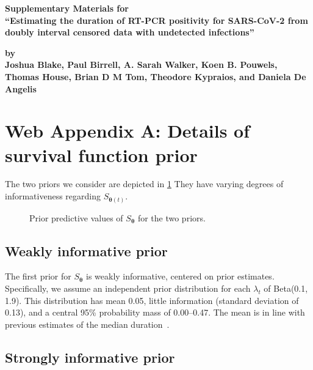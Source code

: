 \documentclass{article}
\renewcommand{\vec}[1]{\bm{#1}}
\begin{document}
%

\def\spacingset#1{\renewcommand{\baselinestretch}%
{#1}\small\normalsize} \spacingset{1}

\begin{center}
{\Large\bfseries Supplementary Materials for\\[6pt]
``Estimating the duration of RT-PCR positivity for SARS-CoV-2 from doubly interval censored data with undetected infections''}

\vskip 18pt

{\large\bfseries by\\[6pt]
Joshua Blake, Paul Birrell, A. Sarah Walker, Koen B. Pouwels, Thomas House, Brian D M Tom, Theodore Kypraios, and Daniela De Angelis}
\end{center}

\clearpage


\section{Web Appendix A: Details of survival function prior} \label{sec:details-priors}

The two priors we consider are depicted in \cref{fig:priors}
They have varying degrees of informativeness regarding $S_{\vec{\theta}(t)}$.
\begin{figure}
  
  \caption{%
    Prior predictive values of $S_{\vec{\theta}}$ for the two priors.
  }
  \label{fig:priors}
\end{figure}

\subsection{Weakly informative prior}

The first prior for $S_{\vec{\theta}}$ is weakly informative, centered on prior estimates.
Specifically, we assume an independent prior distribution for each $\lambda_t$ of Beta(0.1, 1.9).
This distribution has mean 0.05, little information (standard deviation of 0.13), and a central 95\% probability mass of 0.00--0.47.
The mean is in line with previous estimates of the median duration~\citep{cevikShedding}.

\subsection{Strongly informative prior} \label{sec:ataccc-prior}
\end{document}
